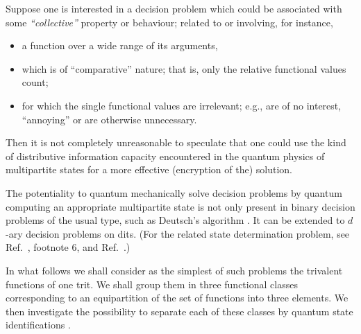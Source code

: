 \documentclass{article}
\begin{document}
Suppose one is interested in a decision problem which could be associated with some {\em ``collective''} property or behaviour;
related to or involving, for instance,
\begin{itemize}
\item
a function over a wide range of its arguments,
\item
which is of ``comparative'' nature; that is, only the relative functional values count;
\item
for which the single functional values are irrelevant;
e.g., are of no interest, ``annoying'' or are otherwise unnecessary.
\end{itemize}
Then it is not completely unreasonable to speculate that one could use the
kind of distributive  information capacity encountered in the quantum physics of multipartite states
for a more effective (encryption of the) solution.

The potentiality to quantum mechanically solve decision problems
by quantum computing an appropriate multipartite state is not only present in binary decision problems of the usual type,
such as Deutsch's algorithm \cite{deutsch,deutsch:92,cleve:98,nielsen-book,mermin-07}.
It can be extended to $d$-ary decision problems on dits. (For the related state determination problem,
see  Ref.~\cite{zeil-99}, footnote 6,
and Ref.~\cite{svozil-2002-statepart-prl}.)


In what follows we shall consider as the simplest of such problems
the trivalent functions of one trit.
We shall group them in three functional classes
corresponding to an equipartition of the set of functions into three elements.
We then investigate
the possibility to separate each of these classes by
quantum state identifications \cite{DonSvo01,svozil-2002-statepart-prl}.
\end{document}
